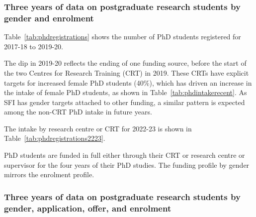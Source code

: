 \subsubsection{Three years of data on postgraduate research students 
by gender and enrolment}
\label{sub:phdnumbers}


Table~\ref{tab:phdregistrations} shows the number of
PhD students registered for  2017-18 to 2019-20. 




The dip in 2019-20 reflects the ending of one funding source,
before the start of the two Centres for Research Training (CRT)
in 2019. These CRTs have explicit targets for 
increased female PhD students (40\%), which has driven an 
increase in the intake of female PhD students, as shown in Table~\ref{tab:phdintakerecent}.
As SFI has gender targets attached to other funding, a similar 
pattern is expected among the non-CRT PhD intake in future years.



The intake by research centre or CRT for 2022-23 is shown in 
Table~\ref{tab:phdregistrations2223}.



PhD students are funded in full either through their CRT or research 
centre or supervisor for the four years of their PhD studies. The 
funding profile by gender mirrors the enrolment profile.

\subsubsection{Three years of data on postgraduate research students by gender, 
application, offer, and enrolment}
\label{sec:phdnumbers}



